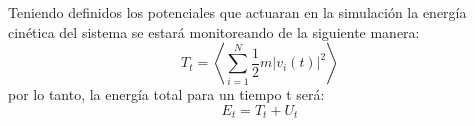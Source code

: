 Teniendo definidos los potenciales que actuaran en la simulación
la energía cinética del sistema se estará monitoreando de la siguiente manera:
\begin{equation}
    \label{eq:kin-n}
    T_t=\left\langle \sum_{i=1}^N \frac{1}{2}m|v_i(t)|^2\right\rangle
\end{equation}
por lo tanto, la energía total para un tiempo t será:
\begin{equation}
    \label{eq:e-tot}
    E_t=T_t+U_t
\end{equation}